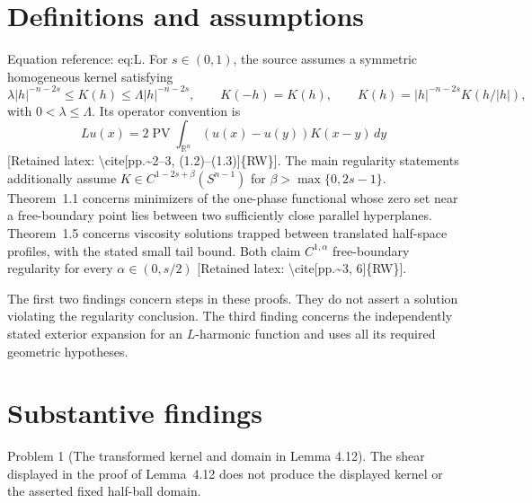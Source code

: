 \documentclass[10pt]{article}
\begin{document}
\section*{Definitions and assumptions}
Equation reference: eq:L. For \(s\in(0,1)\), the source assumes a symmetric homogeneous kernel satisfying \[\lambda |h|^{-n-2s}\le K(h)\le\Lambda |h|^{-n-2s},
 \qquad K(-h)=K(h),\qquad
 K(h)=|h|^{-n-2s}K(h/|h|),\] with \(0<\lambda\le\Lambda\). Its operator convention is \[
 Lu(x)=2\mathop{\mathrm{PV}}\int_{\mathbb R^n}(u(x)-u(y))K(x-y)\,dy\] [Retained latex: \textbackslash{}cite[pp.\textasciitilde{}2--3, (1.2)--(1.3)]\{RW\}]. The main regularity statements additionally assume \(K\in C^{1-2s+\beta}(S^{n-1})\) for \(\beta>\max\{0,2s-1\}\). Theorem 1.1 concerns minimizers of the one-phase functional whose zero set near a free-boundary point lies between two sufficiently close parallel hyperplanes. Theorem 1.5 concerns viscosity solutions trapped between translated half-space profiles, with the stated small tail bound. Both claim \(C^{1,\alpha}\) free-boundary regularity for every \(\alpha\in(0,s/2)\) [Retained latex: \textbackslash{}cite[pp.\textasciitilde{}3, 6]\{RW\}].\par
The first two findings concern steps in these proofs. They do not assert a solution violating the regularity conclusion. The third finding concerns the independently stated exterior expansion for an \(L\)-harmonic function and uses all its required geometric hypotheses.\par
\section*{Substantive findings}
Problem 1 (The transformed kernel and domain in Lemma 4.12).  The shear displayed in the proof of Lemma 4.12 does not produce the displayed kernel or the asserted fixed half-ball domain.\par
\end{document}
